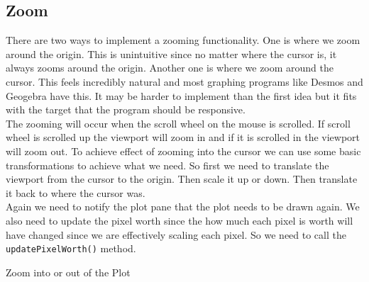 \documentclass[../../../../main.tex]{subfiles}
\begin{document}
\subsection{Zoom}
There are two ways to implement a zooming functionality. One is where we zoom around the origin. This is unintuitive since no matter where the cursor is, it always zooms around the origin. Another one is where we zoom around the cursor. This feels incredibly natural and most graphing programs like Desmos and Geogebra have this. It may be harder to implement than the first idea but it fits with the target that the program should be responsive.\\
The zooming will occur when the scroll wheel on the mouse is scrolled. If scroll wheel is scrolled up the viewport will zoom in and if it is scrolled in the viewport will zoom out. To achieve effect of zooming into the cursor we can use some basic transformations to achieve what we need. So first we need to translate the viewport from the cursor to the origin. Then scale it up or down. Then translate it back to where the cursor was.\\
Again we need to notify the plot pane that the plot needs to be drawn again. We also need to update the pixel worth since the how much each pixel is worth will have changed since we are effectively scaling each pixel. So we need to call the \texttt{updatePixelWorth()} method.
\begin{algorithm}
\DontPrintSemicolon
\caption{Zoom into or out of the Plot}
\end{algorithm}
\newpage
\end{document}
